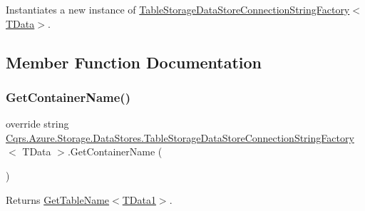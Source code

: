 Instantiates a new instance of \hyperlink{classCqrs_1_1Azure_1_1Storage_1_1DataStores_1_1TableStorageDataStoreConnectionStringFactory_a72218c0219be3c3185ae98893f0d91e3_a72218c0219be3c3185ae98893f0d91e3}{Table\+Storage\+Data\+Store\+Connection\+String\+Factory$<$\+T\+Data$>$}. 



\subsection{Member Function Documentation}
\mbox{\label{classCqrs_1_1Azure_1_1Storage_1_1DataStores_1_1TableStorageDataStoreConnectionStringFactory_aa31a217ca659f298016bd8ecabe98387_aa31a217ca659f298016bd8ecabe98387}} 
\subsubsection{\texorpdfstring{Get\+Container\+Name()}{GetContainerName()}}
{\footnotesize\ttfamily override string \hyperlink{classCqrs_1_1Azure_1_1Storage_1_1DataStores_1_1TableStorageDataStoreConnectionStringFactory}{Cqrs.\+Azure.\+Storage.\+Data\+Stores.\+Table\+Storage\+Data\+Store\+Connection\+String\+Factory}$<$ T\+Data $>$.Get\+Container\+Name (\begin{DoxyParamCaption}{ }\end{DoxyParamCaption})}



Returns \hyperlink{classCqrs_1_1Azure_1_1Storage_1_1DataStores_1_1TableStorageDataStoreConnectionStringFactory_a386df8c514b08c9c39583ea9e9a9abe6_a386df8c514b08c9c39583ea9e9a9abe6}{Get\+Table\+Name$<$\+T\+Data1$>$}. 


